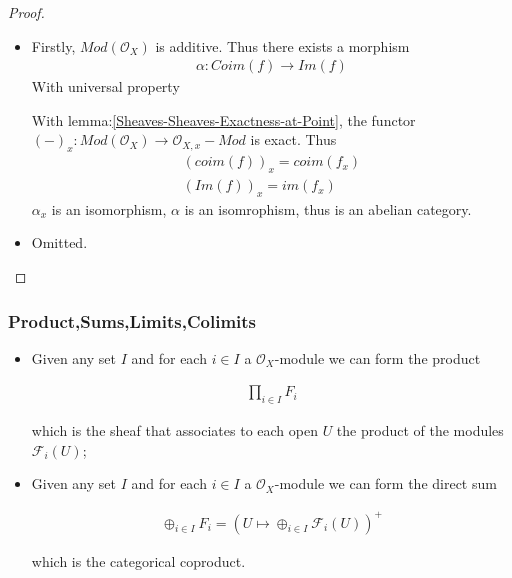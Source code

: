 \documentclass[Total.tex]{subfiles}
\begin{document}
			\begin{proof}
				\begin{itemize}
					\item Firstly, $Mod(\mathcal{O}_X)$ is additive. Thus there exists a morphism
					\begin{gather*}
						\alpha:Coim(f)\rightarrow Im(f)
					\end{gather*}
					With universal property 
					\begin{center}
					\end{center}
					
					With lemma:\ref{Sheaves-Sheaves-Exactness-at-Point}, the functor $(-)_x:Mod(\mathcal{O}_X)\rightarrow \mathcal{O}_{X,x}-Mod$ is exact. Thus
					\begin{gather*}
						(coim(f))_x=coim(f_x)\\
						(Im(f))_x=im(f_x)
					\end{gather*} $\alpha_x$ is an isomorphism, $\alpha$ is an isomrophism, thus is an abelian category.
					\item Omitted.
				\end{itemize}
			\end{proof}
		\subsubsection{Product,Sums,Limits,Colimits}
		
			\begin{Def}
				\begin{itemize}
					\item Given any set $I$ and for each $i\in I$ a $\mathcal{O}_X$-module we can form the product
					
					\begin{gather*}
						\prod_{i\in I} F_i
					\end{gather*}
					
					which is the sheaf that associates to each open $U$ the product of the modules $\mathcal{F}_i(U)$;
					\item Given any set $I$ and for each $i\in I$ a $\mathcal{O}_X$-module we can form the direct sum
					
					\begin{gather*}
						\oplus_{i\in I} F_i=(U\mapsto \oplus_{i\in I} \mathcal{F}_i(U))^+
					\end{gather*}
					
					which is the categorical coproduct.
				\end{itemize}
			\end{Def}
			
\end{document}
